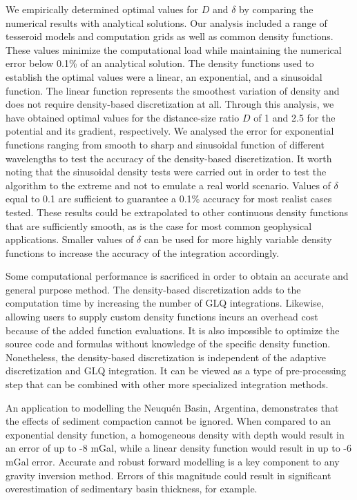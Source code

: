 We empirically determined optimal values for $D$ and $\delta$ by comparing the numerical
results with analytical solutions.
Our analysis included a range of tesseroid models and computation grids as well as
common density functions.
These values minimize the computational load while maintaining the numerical error below
0.1\% of an analytical solution.
The density functions used to establish the optimal values were a linear, an
exponential, and a sinusoidal function.
The linear function represents the smoothest variation of density and does not require
density-based discretization at all.
Through this analysis, we have obtained optimal values for the distance-size ratio $D$
of 1 and 2.5 for the potential and its gradient, respectively.
We analysed the error for exponential functions ranging from smooth to sharp and
sinusoidal function of different wavelengths to test the accuracy of the density-based
discretization.
It worth noting that the sinusoidal density tests were carried out in order to test the
algorithm to the extreme and not to emulate a real world scenario.
Values of $\delta$ equal to 0.1 are sufficient to guarantee a 0.1\% accuracy for most
realist cases tested.
These results could be extrapolated to other continuous density functions that are
sufficiently smooth, as is the case for most common geophysical applications.
Smaller values of $\delta$ can be used for more highly variable density functions to
increase the accuracy of the integration accordingly.

Some computational performance is sacrificed in order to obtain an accurate and general
purpose method.
The density-based discretization adds to the computation time by increasing
the number of GLQ integrations.
Likewise, allowing users to supply custom density functions incurs an overhead cost
because of the added function evaluations.
It is also impossible to optimize the source code and formulas without knowledge of the
specific density function.
Nonetheless, the density-based discretization is independent of the adaptive
discretization and GLQ integration.
It can be viewed as a type of pre-processing step that can be combined with other more
specialized integration methods.

An application to modelling the Neuquén Basin, Argentina, demonstrates that the
effects of sediment compaction cannot be ignored.
When compared to an exponential density function, a homogeneous density with depth would
result in an error of up to -8 mGal, while a linear density function would result in up
to -6 mGal error.
Accurate and robust forward modelling is a key component to any gravity inversion
method.
Errors of this magnitude could result in significant overestimation of sedimentary
basin thickness, for example.



